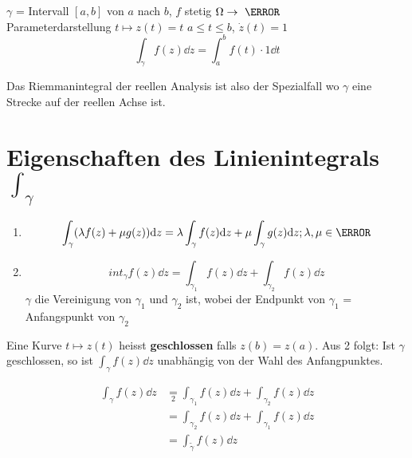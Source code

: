 \begin{bsp}
		$\gamma$ = Intervall $[a,b]$ von $a$ nach $b$, $f$ stetig $\Omega \rightarrow \C$ \\
		Parameterdarstellung $t \mapsto z(t) = t$ $a \leq t \leq b$, $\dot{z}(t) = 1$
		\[ \int_\gamma f(z) \dd z = \int_a^b f(t) \cdot 1 \dd t \]
\end{bsp}
Das Riemmanintegral der reellen Analysis ist also der Spezialfall wo $\gamma$ eine Strecke auf der reellen Achse ist.

\section{Eigenschaften des Linienintegrals \texorpdfstring{$\int_\gamma$}{}}
\begin{enumerate}
	\item \[ \int_\gamma (\lambda f(z) + \mu g(z) ) \dd z = \lambda \int_\gamma f(z) \dd z + \mu \int_\gamma g(z) \dd z ; \lambda ,\mu \in \C \]
	\item \[ int_\gamma f(z) \dd z = \int_{\gamma_1} f(z) \dd z + \int_{\gamma_2} f(z) \dd z \]
		$\gamma$ die Vereinigung von $\gamma_1$ und $\gamma_2$ ist, wobei der Endpunkt von $\gamma_1$ = Anfangspunkt von $\gamma_2$
\end{enumerate}
Eine Kurve $t \mapsto z(t)$ heisst \textbf{geschlossen} falls $z(b) = z(a)$. Aus 2 folgt: Ist $\gamma$ geschlossen, so ist $\int_\gamma f(z) \dd z$ unabhängig von der Wahl des Anfangpunktes. \\
\begin{bew}
	\[ \begin{split}
		\int_\gamma f(z) \dd z	&\underset{2}{=} \int_{\gamma_1} f(z) \dd z + \int_{\gamma_2} f(z) \dd z \\
							&= \int_{\gamma_2} f(z) \dd z + \int_{\gamma_1} f(z) \dd z \\
							&= \int_{\tilde{\gamma}} f(z) \dd z
	\end{split} \]
\end{bew}
